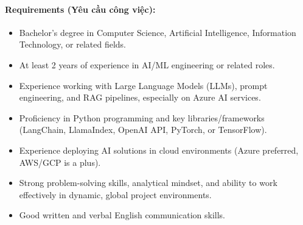 \paragraph{Requirements (Yêu cầu công việc):}
\begin{itemize}
    \item Bachelor's degree in Computer Science, Artificial Intelligence, Information Technology, or related fields.
    \item At least 2 years of experience in AI/ML engineering or related roles.
    \item Experience working with Large Language Models (LLMs), prompt engineering, and RAG pipelines, especially on Azure AI services.
    \item Proficiency in Python programming and key libraries/frameworks (LangChain, LlamaIndex, OpenAI API, PyTorch, or TensorFlow).
    \item Experience deploying AI solutions in cloud environments (Azure preferred, AWS/GCP is a plus).
    \item Strong problem-solving skills, analytical mindset, and ability to work effectively in dynamic, global project environments.
    \item Good written and verbal English communication skills.
\end{itemize}
